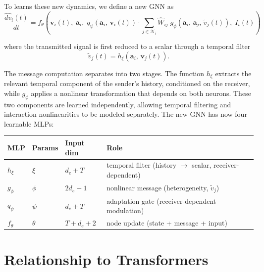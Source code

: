 \documentclass[11pt]{article}
\begin{document}
To learns these new dynamics, we define a new GNN as
\begin{equation}
\boxed{
\frac{\widehat{dv}_i(t)}{dt}
= f_\theta\!\left(
\mathbf{v}_i(t),\;\mathbf{a}_i,\;
q_\psi\!\left(\mathbf{a}_i,\,\mathbf{v}_i(t)\right)
\cdot \sum_{j\in\mathcal{N}_i}
\hat{W}_{ij}\;
g_\phi\!\left(\mathbf{a}_i,\,\mathbf{a}_j,\,\tilde{v}_j(t)\right),\;
I_i(t)
\right)
}
\label{eq:gnn_new}
\end{equation}

where the transmitted signal is first reduced to a scalar through a temporal filter
\begin{equation}
\tilde{v}_j(t) = h_\xi\!\left(\mathbf{a}_i,\,\mathbf{v}_j(t)\right).
\end{equation}

The message computation separates into two stages. The function $h_\xi$ extracts the relevant temporal component of the sender's history, conditioned on the receiver, while $g_\phi$ applies a nonlinear transformation that depends on both neurons. These two components are learned independently, allowing temporal filtering and interaction nonlinearities to be modeled separately. The new GNN has now four learnable MLPs:

\begin{center}
\begin{tabular}{llll}
\toprule
MLP & Params & Input dim & Role \\
\midrule
$h_\xi$ & $\xi$ & $d_e + T$ 
& temporal filter (history $\to$ scalar, receiver-dependent) \\

$g_\phi$ & $\phi$ & $2d_e + 1$ 
& nonlinear message (heterogeneity, $\tilde{v}_j$) \\

$q_\psi$ & $\psi$ & $d_e + T$ 
& adaptation gate (receiver-dependent modulation) \\

$f_\theta$ & $\theta$ & $T + d_e + 2$ 
& node update (state + message + input) \\
\bottomrule
\end{tabular}
\end{center}

\section{Relationship to Transformers}
\end{document}
